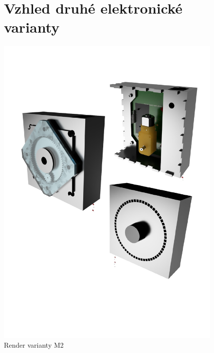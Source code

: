 \begin{figure}
    \section{Vzhled druhé elektronické varianty}
	\centering
	\includegraphics[width=\textwidth]{kapitoly/obrazky/E3/rendery.pdf}
	\caption{Render varianty M2}
	\label{fig:E3-renderi}
\end{figure}

